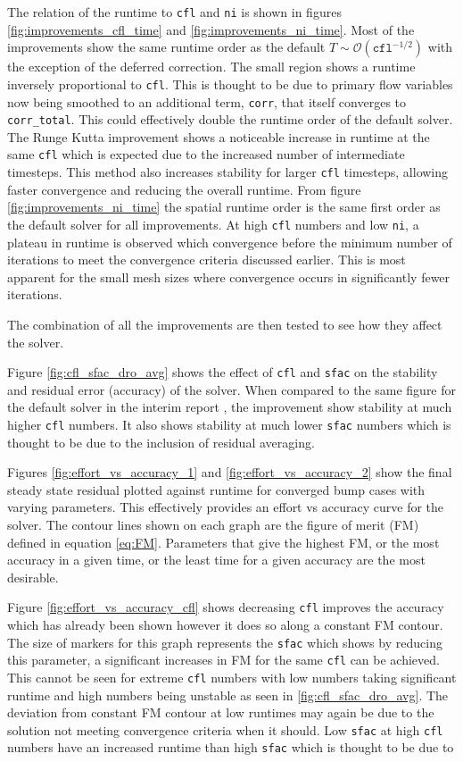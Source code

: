\documentclass{article}
\begin{document}
The relation of the runtime to \texttt{cfl} and \texttt{ni} is shown in figures \ref{fig:improvements_cfl_time} and \ref{fig:improvements_ni_time}.
Most of the improvements show the same runtime order as the default $T\sim\mathcal{O}(\texttt{cfl}^{-1/2})$ with the exception of the deferred correction.
The small region shows a runtime inversely proportional to \texttt{cfl}.
This is thought to be due to primary flow variables now being smoothed to an additional term, \texttt{corr}, that itself converges to \texttt{corr\_total}.
This could effectively double the runtime order of the default solver.
The Runge Kutta improvement shows a noticeable increase in runtime at the same \texttt{cfl} which is expected due to the increased number of intermediate timesteps.
This method also increases stability for larger \texttt{cfl} timesteps, allowing faster convergence and reducing the overall runtime.
From figure \ref{fig:improvements_ni_time} the spatial runtime order is the same first order as the default solver for all improvements.
At high \texttt{cfl} numbers and low \texttt{ni}, a plateau in runtime is observed which convergence before the minimum number of iterations to meet the convergence criteria discussed earlier.
This is most apparent for the small mesh sizes where convergence occurs in significantly fewer iterations.


The combination of all the improvements are then tested to see how they affect the solver.

Figure \ref{fig:cfl_sfac_dro_avg} shows the effect of \texttt{cfl} and \texttt{sfac} on the stability and residual error (accuracy) of the solver.
When compared to the same figure for the default solver in the interim report \cite{interim}, the improvement show stability at much higher \texttt{cfl} numbers.
It also shows stability at much lower \texttt{sfac} numbers which is thought to be due to the inclusion of residual averaging.

Figures \ref{fig:effort_vs_accuracy_1} and \ref{fig:effort_vs_accuracy_2} show the final steady state residual plotted against runtime for converged bump cases with varying parameters.
This effectively provides an effort vs accuracy curve for the solver.
The contour lines shown on each graph are the figure of merit (FM) defined in equation \ref{eq:FM}.
Parameters that give the highest FM, or the most accuracy in a given time, or the least time for a given accuracy are the most desirable.

Figure \ref{fig:effort_vs_accuracy_cfl} shows decreasing \texttt{cfl} improves the accuracy which has already been shown however it does so along a constant FM contour.
The size of markers for this graph represents the \texttt{sfac} which shows by reducing this parameter, a significant increases in FM for the same \texttt{cfl} can be achieved.
This cannot be seen for extreme \texttt{cfl} numbers with low numbers taking significant runtime and high numbers being unstable as seen in \ref{fig:cfl_sfac_dro_avg}.
The deviation from constant FM contour at low runtimes may again be due to the solution not meeting convergence criteria when it should.
Low \texttt{sfac} at high \texttt{cfl} numbers have an increased runtime than high \texttt{sfac} which is thought to be due to %
\end{document}
